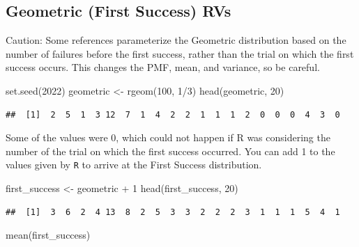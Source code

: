 \documentclass[
]{book}
\newenvironment{Shaded}{\begin{snugshade}}{\end{snugshade}}
\newcommand{\DecValTok}[1]{\textcolor[rgb]{0.00,0.00,0.81}{#1}}
\newcommand{\FunctionTok}[1]{\textcolor[rgb]{0.00,0.00,0.00}{#1}}
\newcommand{\NormalTok}[1]{#1}
\newcommand{\OtherTok}[1]{\textcolor[rgb]{0.56,0.35,0.01}{#1}}
\newcommand{\SpecialCharTok}[1]{\textcolor[rgb]{0.00,0.00,0.00}{#1}}
\theoremstyle{definition}
\theoremstyle{definition}
\theoremstyle{definition}
\theoremstyle{definition}
\theoremstyle{remark}
\begin{document}
\hypertarget{geometric-first-success-rvs}{%
\subsection{Geometric (First Success) RVs}\label{geometric-first-success-rvs}}

Caution: Some references parameterize the Geometric distribution based on the number of failures before the first success, rather than the trial on which the first success occurs. This changes the PMF, mean, and variance, so be careful.

\begin{Shaded}
\begin{Highlighting}[]
\FunctionTok{set.seed}\NormalTok{(}\DecValTok{2022}\NormalTok{)}
\NormalTok{geometric }\OtherTok{\textless{}{-}} \FunctionTok{rgeom}\NormalTok{(}\DecValTok{100}\NormalTok{, }\DecValTok{1}\SpecialCharTok{/}\DecValTok{3}\NormalTok{)}
\FunctionTok{head}\NormalTok{(geometric, }\DecValTok{20}\NormalTok{)}
\end{Highlighting}
\end{Shaded}

\begin{verbatim}
##  [1]  2  5  1  3 12  7  1  4  2  2  1  1  1  2  0  0  0  4  3  0
\end{verbatim}

Some of the values were 0, which could not happen if R was considering the number of the trial on which the first success occurred. You can add 1 to the values given by \texttt{R} to arrive at the First Success distribution.

\begin{Shaded}
\begin{Highlighting}[]
\NormalTok{first\_success }\OtherTok{\textless{}{-}}\NormalTok{ geometric }\SpecialCharTok{+} \DecValTok{1}
\FunctionTok{head}\NormalTok{(first\_success, }\DecValTok{20}\NormalTok{)}
\end{Highlighting}
\end{Shaded}

\begin{verbatim}
##  [1]  3  6  2  4 13  8  2  5  3  3  2  2  2  3  1  1  1  5  4  1
\end{verbatim}

\begin{Shaded}
\begin{Highlighting}[]
\FunctionTok{mean}\NormalTok{(first\_success)}
\end{Highlighting}
\end{Shaded}
\end{document}
